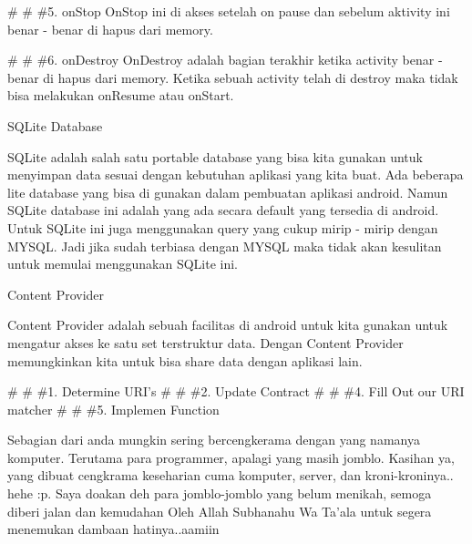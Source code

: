 \vspace{12pt}
\noindent 
 $  \#  $ $  \#  $ $  \#  $5. onStop OnStop ini di akses setelah on pause dan sebelum aktivity ini benar - benar di hapus dari memory. \par
\vspace{12pt}
\noindent 
 $  \#  $ $  \#  $ $  \#  $6. onDestroy OnDestroy adalah bagian terakhir ketika activity benar - benar di hapus dari memory. Ketika sebuah activity telah di destroy maka tidak bisa melakukan onResume atau onStart. \par
\vspace{12pt}
\noindent 
SQLite Database \par
\vspace{12pt}
\noindent 
SQLite adalah salah satu portable database yang bisa kita gunakan untuk menyimpan data sesuai dengan kebutuhan aplikasi yang kita buat. Ada beberapa lite database yang bisa di gunakan dalam pembuatan aplikasi android. Namun SQLite database ini adalah yang ada secara default yang tersedia di android. Untuk SQLite ini juga menggunakan query yang cukup mirip - mirip dengan MYSQL. Jadi jika sudah terbiasa dengan MYSQL maka tidak akan kesulitan untuk memulai menggunakan SQLite ini. \par
\vspace{12pt}
\noindent 
Content Provider \par
\vspace{12pt}
\noindent 
Content Provider adalah sebuah facilitas di android untuk kita gunakan untuk mengatur akses ke satu set terstruktur data. Dengan Content Provider memungkinkan kita untuk bisa share data dengan aplikasi lain. \par
\vspace{12pt}
\noindent 
 $  \#  $ $  \#  $ $  \#  $1. Determine URI's  $  \#  $ $  \#  $ $  \#  $2. Update Contract  $  \#  $ $  \#  $ $  \#  $4. Fill Out our URI matcher  $  \#  $ $  \#  $ $  \#  $5. Implemen Function \par
\vspace{12pt}
\vspace{12pt}
\vspace{12pt}
\noindent 
Sebagian dari anda mungkin sering bercengkerama dengan yang namanya komputer. Terutama para programmer, apalagi yang masih jomblo. Kasihan ya, yang dibuat cengkrama keseharian cuma komputer, server, dan kroni-kroninya.. hehe :p. Saya doakan deh para jomblo-jomblo yang belum menikah, semoga diberi jalan dan kemudahan Oleh Allah Subhanahu Wa Ta’ala untuk segera menemukan dambaan hatinya..aamiin \par
